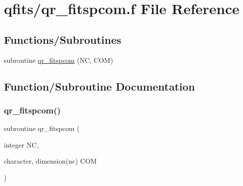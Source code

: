 \hypertarget{qr__fitspcom_8f}{}\section{qfits/qr\+\_\+fitspcom.f File Reference}
\label{qr__fitspcom_8f}
\subsection*{Functions/\+Subroutines}
\begin{DoxyCompactItemize}
\item 
subroutine \hyperlink{qr__fitspcom_8f_ab1e3fd720f0546c69b867dadf58baa23}{qr\+\_\+fitspcom} (NC, C\+OM)
\end{DoxyCompactItemize}


\subsection{Function/\+Subroutine Documentation}
\mbox{\label{qr__fitspcom_8f_ab1e3fd720f0546c69b867dadf58baa23}} 
\subsubsection{\texorpdfstring{qr\+\_\+fitspcom()}{qr\_fitspcom()}}
{\footnotesize\ttfamily subroutine qr\+\_\+fitspcom (\begin{DoxyParamCaption}\item[{integer}]{NC,  }\item[{character, dimension(nc)}]{C\+OM }\end{DoxyParamCaption})}

